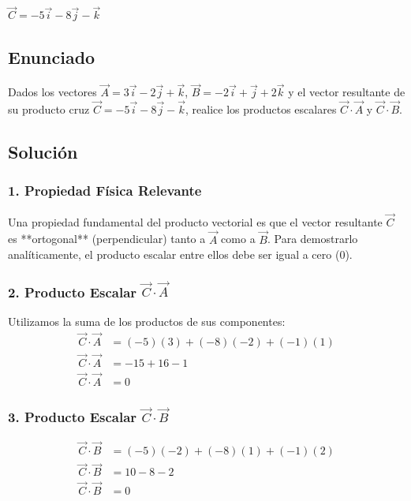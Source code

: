 \documentclass[12pt, a4paper]{article}
\begin{document}
\begin{tcolorbox}[colback=green!5!white, colframe=green!50!black, title=Respuesta Final]
\centering \Large $\vec{C} = -5\vec{i} - 8\vec{j} - \vec{k}$
\end{tcolorbox}

\newpage

\subsection*{Enunciado}
Dados los vectores $\vec{A} = 3\vec{i} - 2\vec{j} + \vec{k}$, $\vec{B} = -2\vec{i} + \vec{j} + 2\vec{k}$ y el vector resultante de su producto cruz $\vec{C} = -5\vec{i} - 8\vec{j} - \vec{k}$, realice los productos escalares $\vec{C} \cdot \vec{A}$ y $\vec{C} \cdot \vec{B}$.

\subsection*{Solución}

\subsubsection*{1. Propiedad Física Relevante}
Una propiedad fundamental del producto vectorial es que el vector resultante $\vec{C}$ es **ortogonal** (perpendicular) tanto a $\vec{A}$ como a $\vec{B}$. Para demostrarlo analíticamente, el producto escalar entre ellos debe ser igual a cero ($0$).

\subsubsection*{2. Producto Escalar $\vec{C} \cdot \vec{A}$}
Utilizamos la suma de los productos de sus componentes:
\begin{align*}
    \vec{C} \cdot \vec{A} &= (-5)(3) + (-8)(-2) + (-1)(1) \\
    \vec{C} \cdot \vec{A} &= -15 + 16 - 1 \\
    \vec{C} \cdot \vec{A} &= 0
\end{align*}

\subsubsection*{3. Producto Escalar $\vec{C} \cdot \vec{B}$}
\begin{align*}
    \vec{C} \cdot \vec{B} &= (-5)(-2) + (-8)(1) + (-1)(2) \\
    \vec{C} \cdot \vec{B} &= 10 - 8 - 2 \\
    \vec{C} \cdot \vec{B} &= 0
\end{align*}
\end{document}
